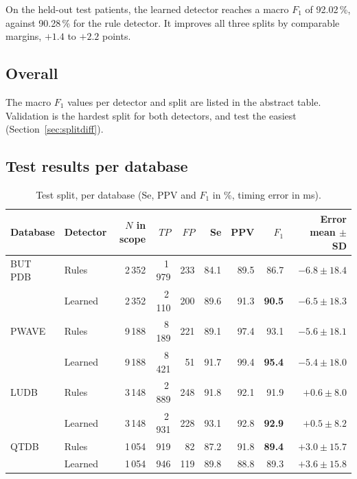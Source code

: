 \documentclass[11pt,a4paper]{article}
\begin{document}
On the held-out test patients, the learned detector reaches a macro $F_1$ of 92.02\,\%, against 90.28\,\% for the rule detector. It improves all three splits by comparable margins, $+1.4$ to $+2.2$ points.

\subsection{Overall}

The macro $F_1$ values per detector and split are listed in the abstract table. Validation is the hardest split for both detectors, and test the easiest (Section~\ref{sec:splitdiff}).

\subsection{Test results per database}

\begin{table}[htbp]
\centering\small
\caption{Test split, per database (Se, PPV and $F_1$ in \%, timing error in ms).}
\label{tab:test}
\begin{tabular}{llrrrrrrr}
\toprule
Database & Detector & $N$ in scope & $TP$ & $FP$ & Se & PPV & $F_1$ & Error mean $\pm$ SD \\
\midrule
BUT PDB & Rules & 2\,352 & 1\,979 & 233 & 84.1 & 89.5 & 86.7 & $-6.8 \pm 18.4$ \\
        & Learned & 2\,352 & 2\,110 & 200 & 89.6 & 91.3 & \textbf{90.5} & $-6.5 \pm 18.3$ \\
\addlinespace
PWAVE   & Rules & 9\,188 & 8\,189 & 221 & 89.1 & 97.4 & 93.1 & $-5.6 \pm 18.1$ \\
        & Learned & 9\,188 & 8\,421 & 51  & 91.7 & 99.4 & \textbf{95.4} & $-5.4 \pm 18.0$ \\
\addlinespace
LUDB    & Rules & 3\,148 & 2\,889 & 248 & 91.8 & 92.1 & 91.9 & $+0.6 \pm 8.0$ \\
        & Learned & 3\,148 & 2\,931 & 228 & 93.1 & 92.8 & \textbf{92.9} & $+0.5 \pm 8.2$ \\
\addlinespace
QTDB    & Rules & 1\,054 & 919 & 82  & 87.2 & 91.8 & \textbf{89.4} & $+3.0 \pm 15.7$ \\
        & Learned & 1\,054 & 946 & 119 & 89.8 & 88.8 & 89.3 & $+3.6 \pm 15.8$ \\
\bottomrule
\end{tabular}
\end{table}
\end{document}
